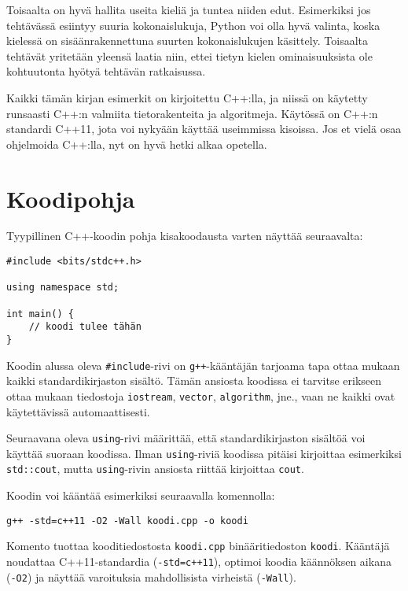 Toisaalta on hyvä hallita useita kieliä
ja tuntea niiden edut.
Esimerkiksi jos tehtävässä esiintyy
suuria kokonaislukuja,
Python voi olla hyvä valinta,
koska kielessä on sisäänrakennettuna
suurten kokonaislukujen käsittely.
Toisaalta tehtävät yritetään yleensä laatia niin,
ettei tietyn kielen ominaisuuksista
ole kohtuutonta hyötyä tehtävän ratkaisussa.

Kaikki tämän kirjan esimerkit on kirjoitettu C++:lla,
ja niissä on käytetty runsaasti C++:n valmiita 
tietorakenteita ja algoritmeja.
Käytössä on C++:n standardi C++11,
jota voi nykyään käyttää useimmissa kisoissa.
Jos et vielä osaa ohjelmoida C++:lla,
nyt on hyvä hetki alkaa opetella.

\section{Koodipohja}

Tyypillinen C++-koodin pohja kisakoodausta varten
näyttää seuraavalta:

\begin{lstlisting}
#include <bits/stdc++.h>

using namespace std;

int main() {
    // koodi tulee tähän
}
\end{lstlisting}

\noindent
Koodin alussa oleva \texttt{\#include}-rivi
on \texttt{g++}-kääntäjän tarjoama tapa
ottaa mukaan kaikki standardikirjaston sisältö.
Tämän ansiosta koodissa ei tarvitse erikseen
ottaa mukaan tiedostoja \texttt{iostream},
\texttt{vector}, \texttt{algorithm}, jne.,
vaan ne kaikki ovat käytettävissä automaattisesti.

Seuraavana oleva \texttt{using}-rivi määrittää,
että standardikirjaston sisältöä voi käyttää
suoraan koodissa.
Ilman \texttt{using}-riviä koodissa pitäisi
kirjoittaa esimerkiksi \texttt{std::cout},
mutta \texttt{using}-rivin ansiosta riittää
kirjoittaa \texttt{cout}.

Koodin voi kääntää esimerkiksi
seuraavalla komennolla:

\begin{lstlisting}
g++ -std=c++11 -O2 -Wall koodi.cpp -o koodi
\end{lstlisting}

Komento tuottaa kooditiedostosta \texttt{koodi.cpp}
binääritiedoston \texttt{koodi}.
Kääntäjä noudattaa C++11-standardia
(\texttt{-std=c++11}),
optimoi koodia käännöksen aikana (\texttt{-O2})
ja näyttää varoituksia
mahdollisista virheistä (\texttt{-Wall}).

